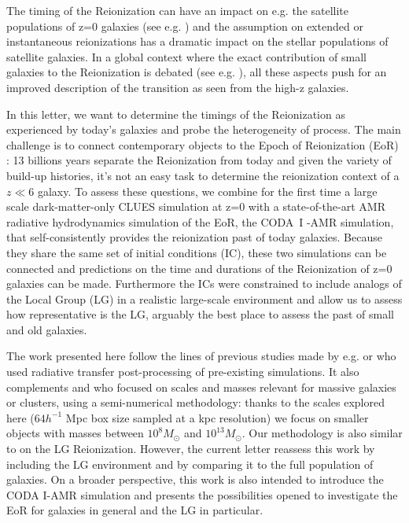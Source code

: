 \documentclass[twocolumn]{aastex61}
\begin{document}
The timing of the Reionization can have an impact on e.g. the satellite populations of z=0 galaxies (see e.g. \citet{KOP9,BUS10,OCV11,ILI11,OCV14,GIL15})
and the assumption on extended or instantaneous reionizations has a dramatic impact on the stellar populations of satellite galaxies. In a global context where the exact contribution of small galaxies to the Reionization is debated (see e.g. \citet{BOU14,FIN15}), all these aspects push for an improved description of the transition as seen from the high-z galaxies. 

In this letter, we want to determine the timings of the Reionization as experienced by today's galaxies and probe the heterogeneity of process. The main challenge is to connect contemporary objects to the Epoch of Reionization (EoR) : 13 billions years separate the Reionization from today and given the variety of build-up histories, it's not an easy task to determine the reionization context of a $z\ll6$ galaxy. To assess these questions, we combine for the first time a large scale dark-matter-only CLUES simulation at z=0 with a state-of-the-art AMR radiative hydrodynamics simulation of the EoR, the CODA~I -AMR simulation, that self-consistently provides the reionization past of today galaxies. Because they share the same set of initial conditions (IC), these two simulations can be connected and predictions on the time and durations of the Reionization of z=0 galaxies can be made. Furthermore the ICs were constrained to include analogs of the Local Group (LG) in a realistic large-scale environment and allow us to assess how representative is the LG, arguably the best place to assess the past of small and old galaxies.  



The work presented here follow the lines of previous studies made by e.g. \citet{WEI07} or \citet{DIX17} who used radiative transfer post-processing of pre-existing simulations. It also complements \citet{ALV9} and \citet{LI14} who focused on scales and masses relevant for massive galaxies or clusters, using a semi-numerical methodology: thanks to the scales explored here ($64 h^{-1}$ Mpc box size sampled at a kpc resolution) we focus on smaller objects with masses between $10^8 M_\odot$ and $10^{13} M_\odot$. 
Our methodology is also similar to \citet{OCV14} on the LG Reionization. However, the current letter reassess this work by including the LG environment and by comparing it to the full population of galaxies. On a broader perspective, this work is also intended to introduce the CODA I-AMR simulation and presents the possibilities opened to investigate the EoR for galaxies in general and the LG in particular.
\end{document}
